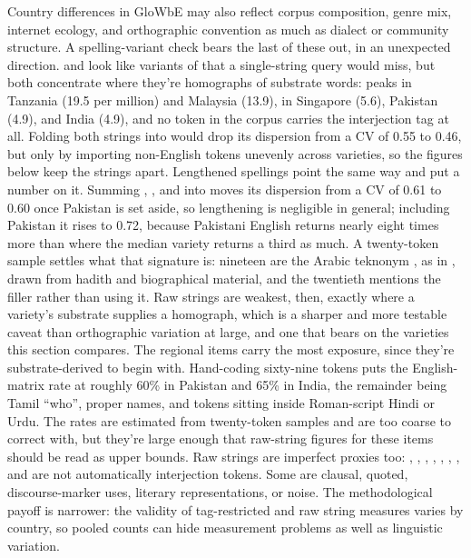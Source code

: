 \documentclass[12pt]{article}
\begin{document}
Country differences in GloWbE may also reflect corpus composition,
genre mix, internet ecology, and orthographic convention as much as
dialect or community structure. A spelling-variant check bears the last of
these out, in an unexpected direction.  and  look
like variants of  that a single-string query would miss, but
both concentrate where they're homographs of substrate words:
 peaks in Tanzania (19.5 per million) and Malaysia (13.9),
 in Singapore (5.6), Pakistan (4.9), and India (4.9), and no
 token in the corpus carries the interjection tag at all.
Folding both strings into  would drop its dispersion from a
CV of 0.55 to 0.46, but only by importing non-English tokens unevenly across
varieties, so the figures below keep the strings apart. Lengthened spellings
point the same way and put a number on it. Summing ,
, and  into  moves its dispersion
from a CV of 0.61 to 0.60 once Pakistan is set aside, so lengthening is
negligible in general; including Pakistan it rises to 0.72, because Pakistani
English returns nearly eight times more  than 
where the median variety returns a third as much. A twenty-token sample
settles what that signature is: nineteen are the Arabic teknonym
, as in , drawn from hadith and biographical
material, and the twentieth mentions the filler rather than using it. Raw
strings are weakest, then, exactly where a variety's substrate supplies a
homograph, which is a sharper and more testable caveat than orthographic
variation at large, and one that bears on the varieties this section
compares. The regional items carry the most exposure, since they're
substrate-derived to begin with. Hand-coding sixty-nine 
tokens puts the English-matrix rate at roughly 60\% in Pakistan and 65\% in
India, the remainder being Tamil  \enquote{who}, proper names,
and tokens sitting inside Roman-script Hindi or Urdu. The rates are estimated
from twenty-token samples and are too coarse to correct with, but they're
large enough that raw-string figures for these items should be read as upper
bounds. Raw strings are imperfect proxies too:
, , , ,
, , , and  are
not automatically interjection tokens. Some are clausal, quoted,
discourse-marker uses, literary representations, or noise. The
methodological payoff is narrower: the validity of tag-restricted and raw
string measures varies by country, so pooled counts can hide measurement
problems as well as linguistic variation.
\end{document}
